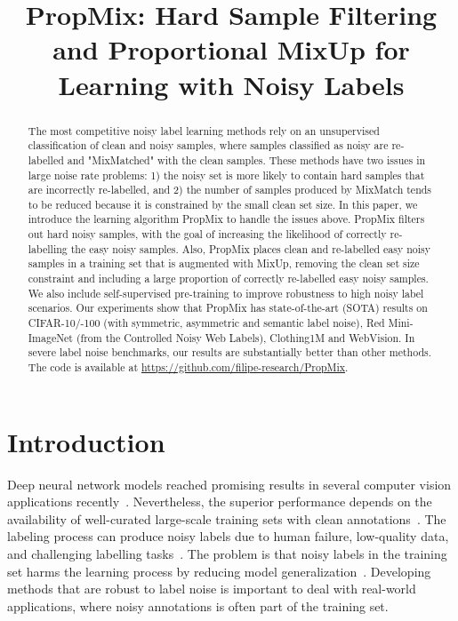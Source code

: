 \documentclass{bmvc2k}
\title{PropMix: Hard Sample Filtering and Proportional MixUp for Learning with Noisy Labels}
\begin{document}
\maketitle

\begin{abstract}
The most competitive noisy label learning methods rely on an unsupervised classification of clean and noisy samples, where
samples classified as noisy are re-labelled and "MixMatched" with the clean samples.
These methods have two issues in large noise rate problems: 1) the noisy set is more likely to contain hard samples that are incorrectly re-labelled, and 2) the number of samples produced by MixMatch tends to be reduced because it is constrained by the small clean set size.
In this paper, we introduce the learning algorithm PropMix to handle the issues above. PropMix filters out hard noisy samples, with the goal of increasing the likelihood of correctly re-labelling the easy noisy samples.
Also, PropMix places clean and re-labelled easy noisy samples in a training set that is augmented with MixUp, removing the clean set size constraint and including a large proportion of correctly re-labelled easy noisy samples. 
We also include self-supervised pre-training to improve robustness to high noisy label scenarios.
Our experiments show that PropMix has state-of-the-art (SOTA) results on CIFAR-10/-100 (with symmetric, asymmetric and semantic 
label noise), Red Mini-ImageNet (from the Controlled Noisy Web Labels), Clothing1M and  WebVision. 
In severe label noise benchmarks, our results are substantially better than other methods. The code is available at \url{https://github.com/filipe-research/PropMix}.
\end{abstract}

\section{Introduction}
\label{sec:intro}


Deep neural network models reached promising results in several computer vision applications recently~\citep{aggarwal2021diagnostic, minaee2021image, grigorescu2020survey}. Nevertheless, the superior performance depends on the availability of well-curated large-scale training sets with clean annotations~\citep{litjens2017survey}. The labeling process can produce noisy labels due to human failure, low-quality data, and challenging labelling tasks~\citep{frenay_survey}. The problem is that noisy labels in the training set harms the learning process by reducing model generalization~\citep{zhang2016understanding}. Developing methods that are robust to label noise is important to deal with real-world applications, where noisy annotations is often part of the training set.
\end{document}
